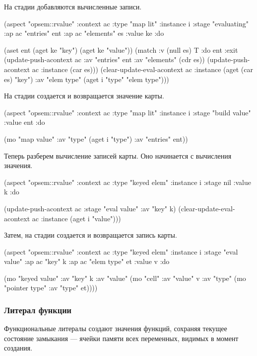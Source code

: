 \documentclass[12pt,twoside,russian]{article}
\newcommand{\textABMLString}[1]{{\color{abmlString}#1}}
\newcommand{\ABMLString}[1]{\abmlinline{\textABMLString{#1}}}
\begin{document}
На стадии \ABMLString{evaluating} добавляются вычисленные записи.

\begin{ABMLCode}
(aspect "opsem::rvalue" :context ac :type "map lit" :instance i 
  :stage "evaluating" :ap ac "entries" ent 
  :ap ac "elements" es :value ke :do 
    
  (aset ent (aget ke "key") (aget ke "value"))
  (match :v (null es) T :do ent 
  :exit (update-push-acontext ac :av "entries" ent 
          :av "elements" (cdr es))
        (update-push-acontext ac :instance (car es)))
        (clear-update-eval-acontext ac :instance (aget (car es) "key") 
          :av "elem type" (aget i "type" "elem type")))
\end{ABMLCode}

На стадии \ABMLString{build value} создается и возвращается значение карты.

\begin{ABMLCode}
(aspect "opsem::rvalue" :context ac :type "map lit" :instance i 
  :stage "build value" :value ent :do 
  
  (mo "map value" :av "type" (aget i "type") :av "entries" ent))
\end{ABMLCode}

Теперь разберем вычисление записей карты. Оно начинается с вычисления значения.

\begin{ABMLCode}
(aspect "opsem::rvalue" :context ac :type "keyed elem" :instance i 
  :stage nil :value k :do 
  
  (update-push-acontext ac :stage "eval value" :av "key" k)
  (clear-update-eval-acontext ac :instance (aget i "value")))
\end{ABMLCode}

Затем, на стадии \ABMLString{eval value} создается и возвращается запись карты.

\begin{ABMLCode}
(aspect "opsem::rvalue" :context ac :type "keyed elem" :instance i 
  :stage "eval value" :ap ac "key" k :ap ac "elem type" et :value v :do 
  
  (mo "keyed value" :av "key" k :av "value" 
    (mo "cell" :av "value" v 
               :av "type" (mo "pointer type" :av "type" et))))
\end{ABMLCode}


\subsubsection{Литерал функции}
Функциональные литералы создают значения функций, сохраняя текущее состояние  замыкания — ячейки памяти всех переменных, видимых в момент создания.
\end{document}
